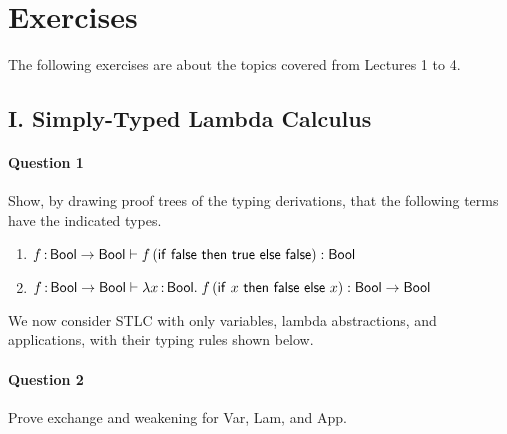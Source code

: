 \documentclass[11pt,a4paper,twoside]{article}
\begin{document}
\section*{Exercises}

The following exercises are about the topics covered from Lectures 1 to 4.

\subsection*{I. Simply-Typed Lambda Calculus}

\paragraph{Question 1} Show, by drawing proof trees of the typing derivations, that the following terms have the indicated types.

\begin{enumerate}[label=(\alph*)]
  \item $\var{f}{\Bool \to \Bool} \vdash \app{f}{(\ifthen{\false}{\true}{\false})} : \Bool$
  \item $\var{f}{\Bool \to \Bool} \vdash \lam{x}{\Bool}{\app{f}{(\ifthen{x}{\false}{x}})} : \Bool \to \Bool$
\end{enumerate}

We now consider STLC with only variables, lambda abstractions, and applications, with their typing rules shown below.

\begin{center}
  \begin{bprooftree}
  \end{bprooftree}
  \qquad
  \begin{bprooftree}
  \end{bprooftree}
  \qquad
  \begin{bprooftree}
  \end{bprooftree}
\end{center}

\vspace{-1.5em}

\paragraph{Question 2} Prove exchange and weakening for Var, Lam, and App.
\end{document}
